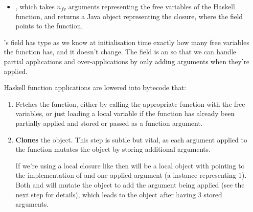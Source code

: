 \documentclass[dissertation.tex]{subfiles}
\begin{document}
{{{\begin{itemize}
{            }
            \item
            {

                , which takes \(n_{fv}\) arguments representing the free variables of the
                Haskell function, and returns a Java  object representing the closure, where the
                 field points to the  function.

            }
            \end{itemize}
            
            's  field has type  as we know at initialisation
            time exactly how many free variables the function has, and it doesn't change. The  field
            is an  so that we can handle partial applications and over-applications by
            only adding arguments when they're applied.

            Haskell function applications are lowered into bytecode that:
            \begin{enumerate}
            \item
            {

                Fetches the function, either by calling the appropriate  function with the free
                variables, or just loading a local variable if the function has already been partially applied and
                stored or passed as a function argument.

            }
            \item
            {

                \textbf{Clones} the  object. This step is subtle but vital, as each argument applied
                to the function mutates the  object by storing additional arguments.
                
                If we're using a local closure like  then
                 will be a local  object with  pointing to the
                implementation of \haskell{(+)} and one applied argument (a  instance representing 1).
                Both  and  will mutate the object to add the argument being applied
                (see the next step for details), which leads to the  object after 
                having 3 stored arguments.

}
\end{enumerate}}}}
\end{document}
